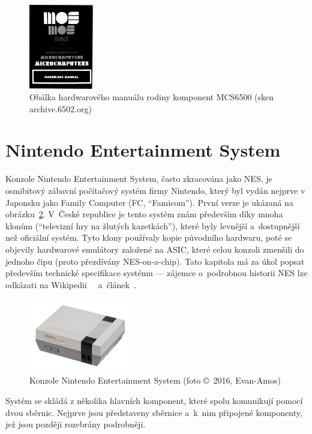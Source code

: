 \begin{figure}[ht!]
	\centering
	\caption{Obálka hardwarového manuálu rodiny komponent MCS6500 (sken archive.6502.org)}
	\label{fig:mos-hw-manual}
	\includegraphics[width=0.25\textwidth]{images/mos-hw-manual.png}
\end{figure}

\section{Nintendo Entertainment System}
Konzole Nintendo Entertainment System, často zkracována jako NES, je osmibitový zábavní počítačový systém firmy Nintendo, který byl vydán nejprve v Japonsku jako Family Computer (FC, \enquote{Famicom}). První verze je ukázaná na obrázku~\ref{fig:nes}. V~České republice je tento systém znám především díky mnoha klonům (\enquote{televizní hry na žlutých kazetkách}), které byly levnější a~dostupnější než oficiální systém. Tyto klony používaly kopie původního hardwaru, poté se objevily hardwarové emulátory založené na ASIC, které celou konzoli zmenšili do jednoho čipu (proto přezdívány NES-on-a-chip). Tato kapitola má za úkol popsat především technické specifikace systému --- zájemce o~podrobnou historii NES lze odkázati na Wikipedii~\cite{Wikipedia:NES}~\cite{Wikipedia:famiclone} a~článek~\cite{Svara:polystation}.

\begin{figure}[ht!]
	\centering
	\caption{Konzole Nintendo Entertainment System (foto \copyright~2016, Evan-Amos)}
	\label{fig:nes}
	\includegraphics[width=0.4\textwidth]{images/nes.jpg}
\end{figure}


Systém se skládá z několika hlavních komponent, které spolu komunikují pomocí dvou sběrnic. Nejprve jsou představeny sběrnice a~k~nim připojené komponenty, jež jsou později rozebrány podrobněji.

